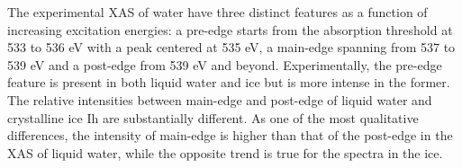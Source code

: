 \documentclass[prb,twocolumn,showpacs,preprintnumbers,superscriptaddress,amsmath,amssymb]{revtex4}
\begin{document}
The experimental XAS of water have three distinct features
as a function of increasing excitation energies:
a pre-edge starts from the absorption threshold at 533 to 536 eV with a peak centered at 535 eV,
a main-edge spanning from 537 to 539 eV and
a post-edge from 539 eV and beyond.\cite{tse2008PRL,nilsson2010x,sellberg2014comparison,schreck2016isotope,nagasaka2017reliable}
Experimentally, the pre-edge feature is present in both liquid water and ice
but is more intense in the former.
The relative intensities between main-edge and post-edge
of liquid water and crystalline ice Ih are substantially different.
\cite{Wernet995,chen2010PRLxas,kong2012PRB,tse2008PRL,sellberg2014comparison,nilsson2010JESRP,pylkkanen2010role,sahle2013microscopic,schreck2016isotope,nagasaka2017reliable}
As one of the most qualitative differences, the intensity of main-edge is higher than that of the post-edge
in the XAS of liquid water,
while the opposite trend is true for the spectra in the ice.
\end{document}
